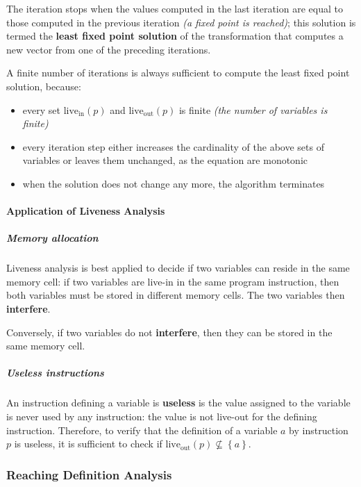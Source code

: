 \documentclass[english]{article}
\begin{document}
The iteration stops when the values computed in the last iteration are equal to those computed in the previous iteration \textit{(a fixed point is reached)};
this solution is termed the \textbf{least fixed point solution} of the transformation that computes a new vector from one of the preceding iterations.

A finite number of iterations is always sufficient to compute the least fixed point solution, because:

\begin{itemize}
  \item every set \(\text{live}_\text{in}\left( p \right)\) and \(\text{live}_\text{out}\left( p \right)\) is finite \textit{(the number of variables is finite)}
  \item every iteration step either increases the cardinality of the above sets of variables or leaves them unchanged, as the equation are monotonic
  \item when the solution does not change any more, the algorithm terminates
\end{itemize}

\paragraph{Application of Liveness Analysis}

\subparagraph*{Memory allocation}

Liveness analysis is best applied to decide if two variables can reside in the same memory cell:
if two variables are live-in in the same program instruction, then both variables must be stored in different memory cells.
The two variables then \textbf{interfere}.

Conversely, if two variables do not \textbf{interfere}, then they can be stored in the same memory cell.

\subparagraph*{Useless instructions}

An instruction defining a variable is \textbf{useless} is the value assigned to the variable is never used by any instruction:
the value is not live-out for the defining instruction.
Therefore, to verify that the definition of a variable \(a\) by instruction \(p\) is useless, it is sufficient to check if \(\text{live}_\text{out}\left( p \right) \not\subseteq \left\{ a \right\}\).

\subsubsection{Reaching Definition Analysis}
\end{document}
